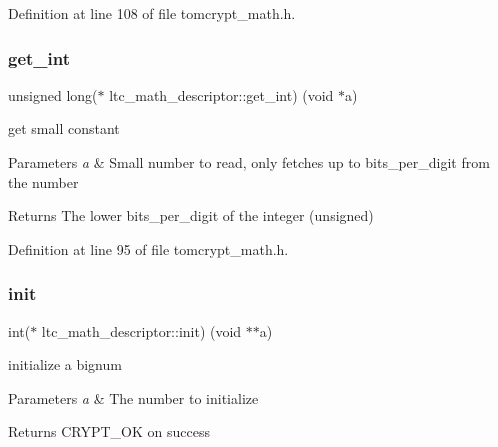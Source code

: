 Definition at line 108 of file tomcrypt\+\_\+math.\+h.

\mbox{\label{structltc__math__descriptor_adc1cbca3af3282460af8ff4ac4dabdeb}} 
\subsubsection{\texorpdfstring{get\_int}{get\_int}}
{\footnotesize\ttfamily unsigned long($\ast$ ltc\+\_\+math\+\_\+descriptor\+::get\+\_\+int) (void $\ast$a)}



get small constant 


\begin{DoxyParams}{Parameters}
{\em a} & Small number to read, only fetches up to bits\+\_\+per\+\_\+digit from the number \\
\hline
\end{DoxyParams}
\begin{DoxyReturn}{Returns}
The lower bits\+\_\+per\+\_\+digit of the integer (unsigned) 
\end{DoxyReturn}


Definition at line 95 of file tomcrypt\+\_\+math.\+h.

\mbox{\label{structltc__math__descriptor_a0663bfda2c6b628f94df2aa82142f921}} 
\subsubsection{\texorpdfstring{init}{init}}
{\footnotesize\ttfamily int($\ast$ ltc\+\_\+math\+\_\+descriptor\+::init) (void $\ast$$\ast$a)}



initialize a bignum 


\begin{DoxyParams}{Parameters}
{\em a} & The number to initialize \\
\hline
\end{DoxyParams}
\begin{DoxyReturn}{Returns}
C\+R\+Y\+P\+T\+\_\+\+OK on success 
\end{DoxyReturn}


